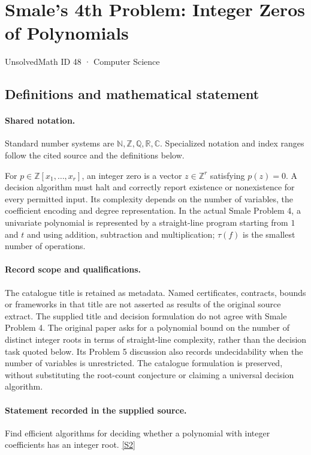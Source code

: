\documentclass[11pt]{article}
\newcommand{\sref}[2]{\hyperlink{source:#1:#2}{[S#2]}}
\begin{document}
\setcounter{section}{47}
\section{Smale's 4th Problem: Integer Zeros of Polynomials}\label{48}
{\small\sffamily UnsolvedMath ID 48 · Computer Science}
\subsection{Definitions and mathematical statement}

\paragraph{Shared notation.}Standard number systems are $\mathbb N,\mathbb Z,\mathbb Q,\mathbb R,\mathbb C$. Specialized notation and index ranges follow the cited source and the definitions below.


For $p\in\mathbb Z[x_1,\ldots,x_r]$, an integer zero is a vector $z\in\mathbb Z^r$ satisfying $p(z)=0$. A decision algorithm must halt and correctly report existence or nonexistence for every permitted input. Its complexity depends on the number of variables, the coefficient encoding and degree representation. In the actual Smale Problem 4, a univariate polynomial is represented by a straight-line program starting from $1$ and $t$ and using addition, subtraction and multiplication; $\tau(f)$ is the smallest number of operations.
\paragraph{Record scope and qualifications.}
The catalogue title is retained as metadata. Named certificates, contracts, bounds or frameworks in that title are not asserted as results of the original source extract.
The supplied title and decision formulation do not agree with Smale Problem 4. The original paper asks for a polynomial bound on the number of distinct integer roots in terms of straight-line complexity, rather than the decision task quoted below. Its Problem 5 discussion also records undecidability when the number of variables is unrestricted. The catalogue formulation is preserved, without substituting the root-count conjecture or claiming a universal decision algorithm.
\paragraph{Statement recorded in the supplied source.}
Find efficient algorithms for deciding whether a polynomial with integer coefficients has an integer root. \sref{48}{2}
\end{document}
